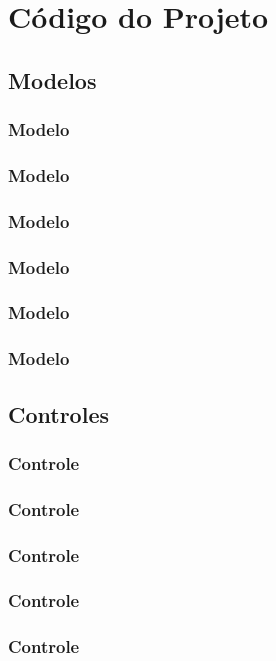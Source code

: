 \section{Código do Projeto}

\subsection{Modelos}

\subsubsection{Modelo}
\subsubsection{Modelo}
\subsubsection{Modelo}
\subsubsection{Modelo}
\subsubsection{Modelo}
\subsubsection{Modelo}

\subsection{Controles}

\subsubsection{Controle}
\subsubsection{Controle}
\subsubsection{Controle}
\subsubsection{Controle}
\subsubsection{Controle}

